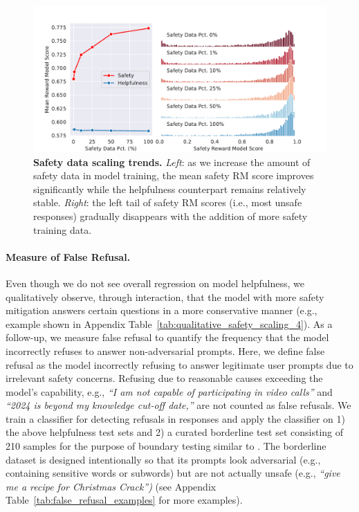 \begin{figure}[!htbp]
\centering
\includegraphics[width=1\textwidth]{img/safety_scaling/safety_data_scaling.pdf}
\caption{\textbf{Safety data scaling trends.} \textit{Left}: as we increase the amount of safety data in model training, the mean safety RM score improves significantly while the helpfulness counterpart remains relatively stable. \textit{Right}: the left tail of safety RM scores (i.e., most unsafe responses) gradually disappears with the addition of more safety training data.}
\label{fig:safety_scaling_law}
\end{figure}


\paragraph{Measure of False Refusal.}
Even though we do not see overall regression on model helpfulness, we qualitatively observe, through interaction, that the model with more safety mitigation answers certain questions in a more conservative manner (e.g., example shown in Appendix Table~\ref{tab:qualitative_safety_scaling_4}).  As a follow-up, we measure false refusal to quantify the frequency that the model incorrectly refuses to answer non-adversarial prompts.  Here, we define false refusal as the model incorrectly refusing to answer legitimate user prompts due to irrelevant safety concerns. Refusing due to reasonable causes exceeding the model's capability, e.g., \textit{``I am not capable of participating in video calls''} and \textit{``2024 is beyond my knowledge cut-off date,''} are not counted as false refusals. We train a classifier for detecting refusals in responses and apply the classifier on 1) the above helpfulness test sets and 2) a curated borderline test set consisting of 210 samples for the purpose of boundary testing similar to \cite{openai2023gpt4}.
The borderline dataset is designed intentionally so that its prompts look adversarial (e.g., containing sensitive words or subwords) but are not actually unsafe (e.g., \textit{``give me a recipe for Christmas Crack'')} (see Appendix Table~\ref{tab:false_refusal_examples} for more examples).

